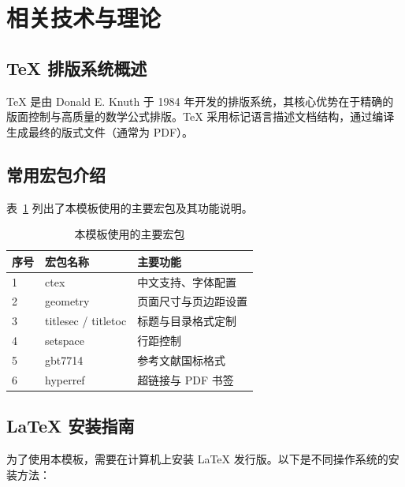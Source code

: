 \section{相关技术与理论}

\subsection{\TeX{} 排版系统概述}

\TeX{} 是由 Donald E. Knuth 于 1984 年开发的排版系统，其核心优势在于精确的版面控制与高质量的数学公式排版\cite{knuth1984texbook}。\TeX{} 采用标记语言描述文档结构，通过编译生成最终的版式文件（通常为 PDF）。

\subsection{常用宏包介绍}

表~\ref{tab:packages} 列出了本模板使用的主要宏包及其功能说明。

\begin{table}[htbp]
\centering
\caption{本模板使用的主要宏包}
\label{tab:packages}
\begin{tabular}{lll}
\toprule
序号 & 宏包名称 & 主要功能 \\
\midrule
1 & ctex & 中文支持、字体配置 \\
2 & geometry & 页面尺寸与页边距设置 \\
3 & titlesec / titletoc & 标题与目录格式定制 \\
4 & setspace & 行距控制 \\
5 & gbt7714 & 参考文献国标格式 \\
6 & hyperref & 超链接与 PDF 书签 \\
\bottomrule
\end{tabular}
\end{table}

\subsection{LaTeX 安装指南}

为了使用本模板，需要在计算机上安装 LaTeX 发行版。以下是不同操作系统的安装方法：

